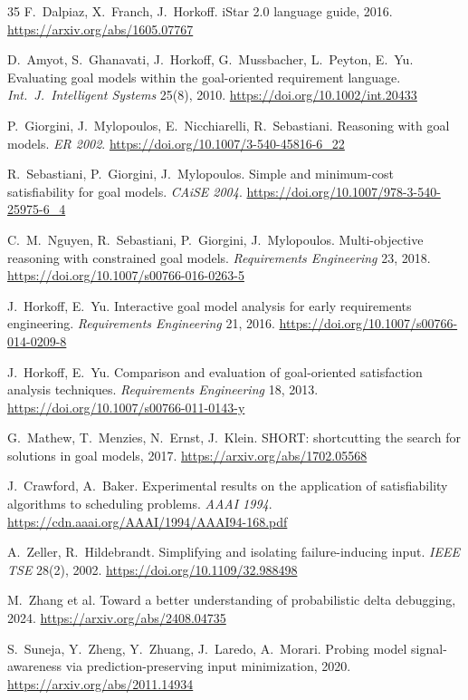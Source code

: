 \documentclass[sigconf,nonacm]{acmart}
\begin{document}
\begin{thebibliography}{35}
 F.~Dalpiaz, X.~Franch, J.~Horkoff. iStar
2.0 language guide, 2016.
\url{https://arxiv.org/abs/1605.07767}

 D.~Amyot, S.~Ghanavati, J.~Horkoff,
G.~Mussbacher, L.~Peyton, E.~Yu. Evaluating goal models within
the goal-oriented requirement language. \emph{Int.\ J.\
Intelligent Systems} 25(8), 2010.
\url{https://doi.org/10.1002/int.20433}

 P.~Giorgini, J.~Mylopoulos,
E.~Nicchiarelli, R.~Sebastiani. Reasoning with goal models.
\emph{ER 2002}.
\url{https://doi.org/10.1007/3-540-45816-6_22}

 R.~Sebastiani, P.~Giorgini,
J.~Mylopoulos. Simple and minimum-cost satisfiability for goal
models. \emph{CAiSE 2004}.
\url{https://doi.org/10.1007/978-3-540-25975-6_4}

 C.~M.~Nguyen, R.~Sebastiani, P.~Giorgini,
J.~Mylopoulos. Multi-objective reasoning with constrained goal
models. \emph{Requirements Engineering} 23, 2018.
\url{https://doi.org/10.1007/s00766-016-0263-5}

 J.~Horkoff, E.~Yu. Interactive goal model
analysis for early requirements engineering.
\emph{Requirements Engineering} 21, 2016.
\url{https://doi.org/10.1007/s00766-014-0209-8}

 J.~Horkoff, E.~Yu. Comparison and
evaluation of goal-oriented satisfaction analysis techniques.
\emph{Requirements Engineering} 18, 2013.
\url{https://doi.org/10.1007/s00766-011-0143-y}

 G.~Mathew, T.~Menzies, N.~Ernst, J.~Klein.
SHORT: shortcutting the search for solutions in goal models,
2017. \url{https://arxiv.org/abs/1702.05568}

 J.~Crawford, A.~Baker. Experimental
results on the application of satisfiability algorithms to
scheduling problems. \emph{AAAI 1994}.
\url{https://cdn.aaai.org/AAAI/1994/AAAI94-168.pdf}

 A.~Zeller, R.~Hildebrandt. Simplifying and
isolating failure-inducing input. \emph{IEEE TSE} 28(2), 2002.
\url{https://doi.org/10.1109/32.988498}

 M.~Zhang et al. Toward a better
understanding of probabilistic delta debugging, 2024.
\url{https://arxiv.org/abs/2408.04735}

 S.~Suneja, Y.~Zheng, Y.~Zhuang, J.~Laredo,
A.~Morari. Probing model signal-awareness via
prediction-preserving input minimization, 2020.
\url{https://arxiv.org/abs/2011.14934}


\end{thebibliography}
\end{document}
